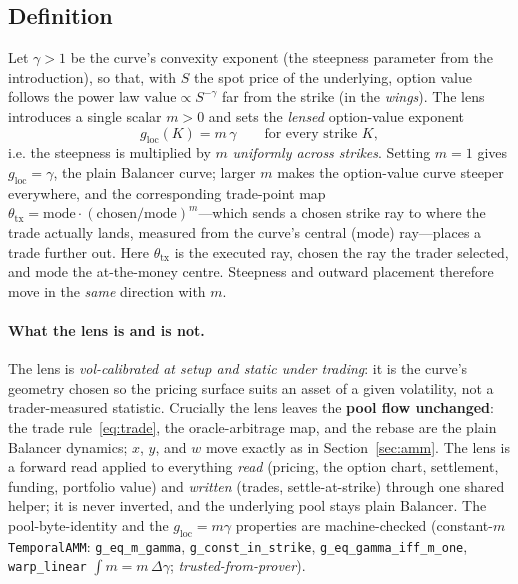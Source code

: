 \documentclass[runningheads]{llncs}
\newcommand{\tfp}{\emph{trusted-from-prover}}
\begin{document}
\subsection{Definition}
Let $\gamma>1$ be the curve's convexity exponent (the steepness parameter from the
introduction), so that, with $S$ the spot price of the underlying, option value
follows the power law $\mathrm{value}\propto S^{-\gamma}$ far from the strike (in
the \emph{wings}). The lens introduces a single scalar $m>0$ and sets the
\emph{lensed} option-value exponent
\begin{equation}
  g_{\mathrm{loc}}(K)=m\,\gamma\qquad\text{for every strike }K,
  \label{eq:lens}
\end{equation}
i.e. the steepness is multiplied by $m$ \emph{uniformly across strikes}. Setting
$m=1$ gives $g_{\mathrm{loc}}=\gamma$, the plain Balancer curve; larger $m$ makes
the option-value curve steeper everywhere, and the corresponding trade-point map
$\theta_{\mathrm{tx}}=\mathrm{mode}\cdot(\mathrm{chosen}/\mathrm{mode})^{m}$---which
sends a chosen strike ray to where the trade actually lands, measured from the
curve's central ($\mathrm{mode}$) ray---places a trade further out. Here
$\theta_{\mathrm{tx}}$ is the executed ray, $\mathrm{chosen}$ the ray the trader
selected, and $\mathrm{mode}$ the at-the-money centre. Steepness and outward
placement therefore move in the \emph{same} direction with $m$.

\paragraph{What the lens is and is not.}
The lens is \emph{vol-calibrated at setup and static under trading}: it is the
curve's geometry chosen so the pricing surface suits an asset of a given
volatility, not a trader-measured statistic. Crucially the lens leaves the
\textbf{pool flow unchanged}: the trade rule~\eqref{eq:trade}, the
oracle-arbitrage map, and the rebase are the plain Balancer dynamics; $x$, $y$,
and $w$ move exactly as in Section~\ref{sec:amm}. The lens is a forward read
applied to everything \emph{read} (pricing, the option chart, settlement,
funding, portfolio value) and \emph{written} (trades, settle-at-strike) through
one shared helper; it is never inverted, and the underlying pool stays plain
Balancer. The pool-byte-identity and the $g_{\mathrm{loc}}=m\gamma$ properties
are machine-checked (constant-$m$ \texttt{TemporalAMM}: \texttt{g\_eq\_m\_gamma},
\texttt{g\_const\_in\_strike}, \texttt{g\_eq\_gamma\_iff\_m\_one},
\texttt{warp\_linear} $\int m = m\,\Delta\gamma$; \tfp{}).
\end{document}
